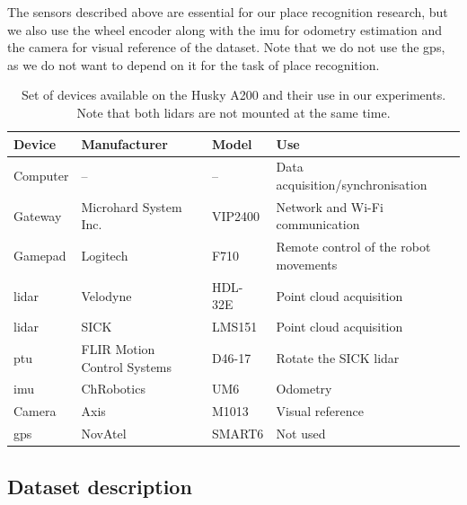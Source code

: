 The sensors described above are essential for our place recognition research, but we also use the wheel encoder along with the \gls{imu} for odometry estimation and the camera for visual reference of the dataset. Note that we do not use the \gls{gps}, as we do not want to depend on it for the task of place recognition.

\begin{table}[h]
    \centering
    \begin{tabular}{@{}llll@{}}
        \toprule
        \textbf{Device} & \textbf{Manufacturer}       & \textbf{Model}  & \textbf{Use}                          \\ \hline
        Computer        & --                          & --              & Data acquisition/synchronisation      \\
        Gateway         & Microhard System Inc.       & VIP2400         & Network and Wi-Fi communication       \\
        Gamepad         & Logitech                    & F710            & Remote control of the robot movements \\
        \gls{lidar}     & Velodyne                    & HDL-32E         & Point cloud acquisition               \\
        \gls{lidar}     & SICK                        & LMS151          & Point cloud acquisition               \\
        \gls{ptu}       & FLIR Motion Control Systems & D46-17          & Rotate the SICK \gls{lidar}           \\
        \gls{imu}       & ChRobotics                  & UM6             & Odometry                              \\
        Camera          & Axis                        & M1013           & Visual reference                      \\
        \gls{gps}       & NovAtel                     & SMART6          & Not used                              \\
        \bottomrule
    \end{tabular}
    \caption{Set of devices available on the Husky A200 and their use in our experiments. Note that both \gls{lidar}s are not mounted at the same time.}
    \label{tab:husky_devices}
\end{table}


\subsection{Dataset description}
\label{ssec:chap_slam_platform}

